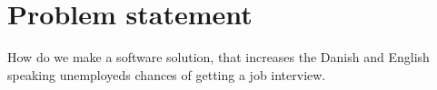 \section{Problem statement}\label{sec:problem}
How do we make a software solution, that increases the Danish and English
speaking unemployeds chances of getting a job interview.